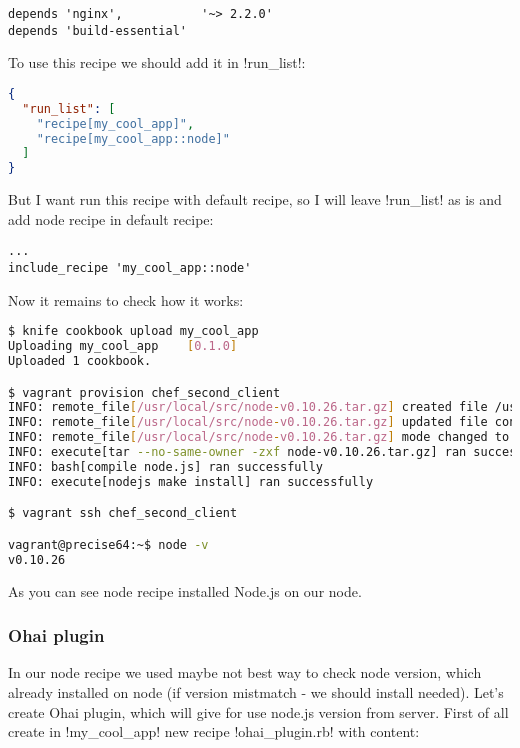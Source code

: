 \begin{lstlisting}[label=lst:cookbook-ohai-meta]
depends 'nginx',           '~> 2.2.0'
depends 'build-essential'
\end{lstlisting}

To use this recipe we should add it in \inline!run_list!:

\begin{lstlisting}[language=JSON,label=lst:cookbook-ohai2]
{
  "run_list": [
    "recipe[my_cool_app]",
    "recipe[my_cool_app::node]"
  ]
}
\end{lstlisting}

But I want run this recipe with default recipe, so I will leave \inline!run_list! as is and add node recipe in default recipe:

\begin{lstlisting}[label=lst:cookbook-ohai3]
...
include_recipe 'my_cool_app::node'
\end{lstlisting}

Now it remains to check how it works:

\begin{lstlisting}[language=Bash,label=lst:cookbook-ohai4]
$ knife cookbook upload my_cool_app
Uploading my_cool_app    [0.1.0]
Uploaded 1 cookbook.

$ vagrant provision chef_second_client
INFO: remote_file[/usr/local/src/node-v0.10.26.tar.gz] created file /usr/local/src/node-v0.10.26.tar.gz
INFO: remote_file[/usr/local/src/node-v0.10.26.tar.gz] updated file contents /usr/local/src/node-v0.10.26.tar.gz
INFO: remote_file[/usr/local/src/node-v0.10.26.tar.gz] mode changed to 644
INFO: execute[tar --no-same-owner -zxf node-v0.10.26.tar.gz] ran successfully
INFO: bash[compile node.js] ran successfully
INFO: execute[nodejs make install] ran successfully

$ vagrant ssh chef_second_client

vagrant@precise64:~$ node -v
v0.10.26
\end{lstlisting}

As you can see node recipe installed Node.js on our node.

\subsubsection{Ohai plugin}

In our node recipe we used maybe not best way to check node version, which already installed on node (if version mistmatch - we should install needed). Let's create Ohai plugin, which will give for use node.js version from server. First of all create in \inline!my_cool_app! new recipe \inline!ohai_plugin.rb! with content:

